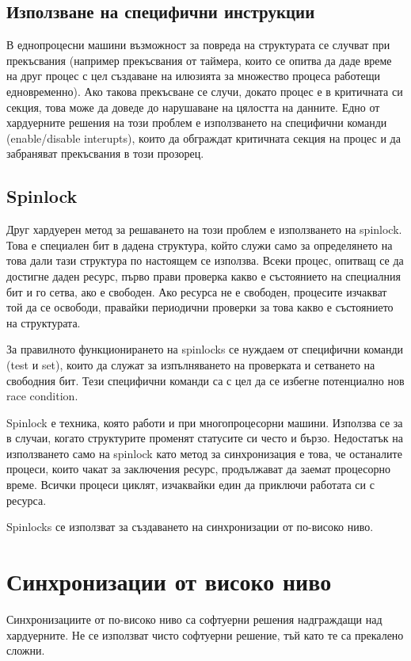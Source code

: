 \documentclass[fleqn,12pt]{article}
\begin{document}
\subsection{Използване на специфични инструкции}
    В еднопроцесни машини възможност за повреда на структурата се случват при прекъсвания (например прекъсвания от таймера, които се опитва да даде време на друг процес с цел създаване на илюзията за множество процеса работещи едновременно). Ако такова прекъсване се случи, докато процес е в критичната си секция, това може да доведе до нарушаване на цялостта на данните. Едно от хардуерните решения на този проблем е използването на специфични команди (enable/disable interupts), които да обграждат критичната секция на процес и да забраняват прекъсвания в този прозорец.


\subsection{Spinlock}
    Друг хардуерен метод за решаването на този проблем е използването на spinlock. Това е специален бит в дадена структура, който служи само за определянето на това дали тази структура по настоящем се използва. Всеки процес, опитващ се да достигне даден ресурс, първо прави проверка какво е състоянието на специалния бит и го сетва, ако е свободен. Ако ресурса не е свободен, процесите изчакват той да се освободи, правайки периодични проверки за това какво е състоянието на структурата.

    За правилното функционирането на spinlocks се нуждаем от специфични команди (test и set), които да служат за изпълняването на проверката и сетването на свободния бит. Тези специфични команди са с цел да се избегне потенциално нов race condition.

    Spinlock е техника, която работи и при многопроцесорни машини. Използва се за в случаи, когато структурите променят статусите си често и бързо. Недостатък на използването само на spinlock като метод за синхронизация е това, че останалите процеси, които чакат за заключения ресурс, продължават да заемат процесорно време. Всички процеси циклят, изчаквайки един да приключи работата си с ресурса.

    Spinlocks се използват за създаването на синхронизации от по-високо ниво.


\section{Синхронизации от високо ниво}
    Синхронизациите от по-високо ниво са софтуерни решения надграждащи над хардуерните. Не се използват чисто софтуерни решение, тъй като те са прекалено сложни.
\end{document}
